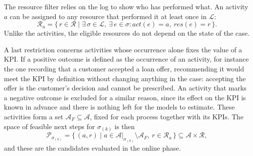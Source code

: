 The resource filter relies on the log to show who has performed what. An
activity $a$ can be assigned to any resource that performed it at least
once in $\mathcal{L}$:
\begin{equation}
  \mathcal{R}_a = \{\, r \in \mathcal{R} \mid \exists\, \sigma \in
  \mathcal{L},\ \exists\, e \in \sigma : act(e) = a,\ res(e) = r \,\}.
  \label{eq:met:off:resources}
\end{equation}
Unlike the activities, the eligible resources do not depend on the state of
the case.

A last restriction concerns activities whose occurrence alone fixes the
value of a KPI. If a positive outcome is defined as the occurrence of an
activity, for instance the one recording that a customer accepted a loan
offer, recommending it would meet the KPI by definition without changing
anything in the case: accepting the offer is the customer's decision and
cannot be prescribed. An activity that marks a negative outcome is excluded
for a similar reason, since its effect on the KPI is known in advance and
there is nothing left for the models to estimate. These activities form a
set $\mathcal{A}_{F} \subseteq \mathcal{A}$, fixed for each process together
with its KPIs. The space of feasible next steps for $\sigma_{(k)}$ is then
\begin{equation}
  \mathcal{P}_{\sigma_{(k)}} = \{\, (a, r) \mid a \in
  \mathcal{A}|_{\sigma_{(k)}} \setminus \mathcal{A}_{F},\ r \in \mathcal{R}_a
  \,\} \subseteq \mathcal{A} \times \mathcal{R},
  \label{eq:met:off:steps}
\end{equation}
and these are the candidates evaluated in the online phase.


